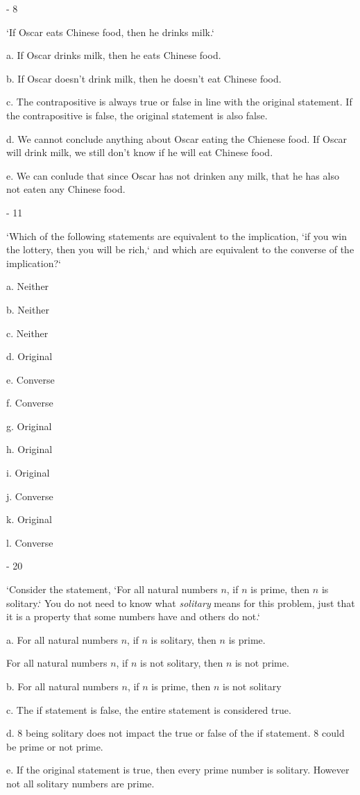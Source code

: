 \documentclass{article}
\begin{document}
- 8

 `If Oscar eats Chinese food, then he drinks milk.`

    a. If Oscar drinks milk, then he eats Chinese food.

    b. If Oscar doesn't drink milk, then he doesn't eat Chinese food.

    c. The contrapositive is always true or false in line with the original statement. If the contrapositive is false, the original statement is also false.

    d. We cannot conclude anything about Oscar eating the Chienese food. If Oscar will drink milk, we still don't know if he will eat Chinese food.

    e. We can conlude that since Oscar has not drinken any milk, that he has also not eaten any Chinese food.

- 11

`Which of the following statements are equivalent to the implication, `if you win the lottery, then you will be rich,` and which are equivalent to the converse of the implication?`

    a. Neither

    b. Neither

    c. Neither

    d. Original

    e. Converse

    f. Converse

    g. Original

    h. Original

    i. Original

    j. Converse

    k. Original

    l. Converse

- 20

`Consider the statement, `For all natural numbers $n$, if $n$ is prime, then $n$ is solitary.` You do not need to know what \textit{solitary} means for this problem, just that it is a property that some numbers have and others do not.`

    a. For all natural numbers $n$, if $n$ is solitary, then $n$ is prime.
    
 For all natural numbers $n$, if $n$ is not solitary, then $n$ is not prime.

    b. For all natural numbers $n$, if $n$ is prime, then $n$ is not solitary

    c. The if statement is false, the entire statement is considered true.

    d. 8 being solitary does not impact the true or false of the if statement. 8 could be prime or not prime.

    e. If the original statement is true, then every prime number is solitary. However not all solitary numbers are prime.
\end{document}

